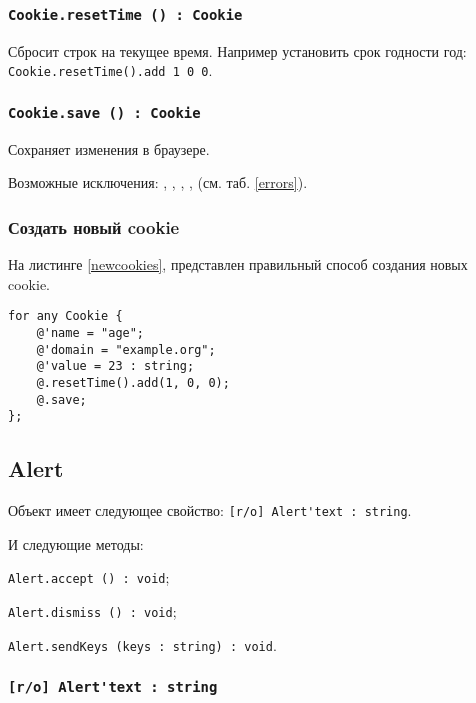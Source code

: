 \subsubsection{\lstinline|Cookie.resetTime () : Cookie|}

Сбросит строк на текущее время. Например установить срок годности год: \lstinline|Cookie.resetTime().add 1 0 0|.

\subsubsection{\lstinline|Cookie.save () : Cookie|}

Сохраняет изменения в браузере.

Возможные исключения: , , , ,  (см. таб. \ref{errors}).

\subsubsection{Создать новый cookie}

На листинге \ref{newcookies}, представлен правильный способ создания новых cookie.

\begin{lstlisting}[caption=Создания новых cookie, label=newcookies]
for any Cookie {
	@'name = "age";
	@'domain = "example.org";
	@'value = 23 : string;
	@.resetTime().add(1, 0, 0);
	@.save;
};
\end{lstlisting}


\subsection{{\color{orange} Alert}}

Объект \alert{} имеет следующее свойство: \lstinline|[r/o] Alert'text : string|.

И следующие методы:
\begin{icItems}
	\item \lstinline|Alert.accept () : void|;
	\item \lstinline|Alert.dismiss () : void|;
	\item \lstinline|Alert.sendKeys (keys : string) : void|.
\end{icItems}

\subsubsection{\lstinline|[r/o] Alert'text : string|}

